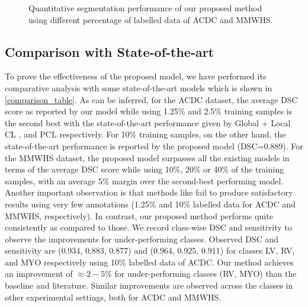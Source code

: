 \documentclass[runningheads]{llncs}
\begin{document}
\begin{figure}[tbp]
 \centering
    \hspace{0cm}
    \caption{Quantitative segmentation performance of our proposed method using different percentage of labelled data of ACDC and MMWHS.}
    \label{quant_result_fig}
\end{figure}





\subsection{Comparison with State-of-the-art}
To prove the effectiveness of the proposed model, we have performed its comparative analysis with some state-of-the-art models \cite{chen2020simple,hu2021semi,chen2019self,chaitanya2019semi} which is shown in \autoref{comparison_table}. As can be inferred, for the ACDC dataset, the average DSC score as reported by our model while using 1.25$\%$ and 2.5$\%$ training samples is the second best with the state-of-the-art performance given by Global + Local CL \cite{chaitanya2020contrastive}, and PCL \cite{zeng2021positional} respectively. For 10$\%$ training samples, on the other hand, the state-of-the-art performance is reported by the proposed model (DSC=0.889). For the MMWHS dataset, the proposed model surpasses all the existing models in terms of the average DSC score while using 10$\%$, 20$\%$ or 40$\%$ of the training samples, with an average 5$\%$ margin over the second-best performing model. Another important observation is that methods like \cite{zeng2021positional,bai2017semi,hu2021semi} fail to produce satisfactory results using very few annotations (1.25\% and 10\% labelled data for ACDC and MMWHS, respectively). In contrast, our proposed method performs quite consistently as compared to those. We record class-wise DSC and sensitivity to observe the improvements for under-performing classes. Observed DSC and sensitivity are (0.934, 0.883, 0.877) and (0.964, 0.925, 0.911) for classes LV, RV, and MYO respectively using 10\% labelled data of ACDC. Our method achieves an improvement of $\approx2-5\%$ for under-performing classes (RV, MYO) than the baseline and literature. Similar improvements are observed across the classes in other experimental settings, both for ACDC and MMWHS.
\end{document}
